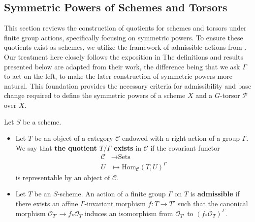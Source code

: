 \subsection{Symmetric Powers of Schemes and Torsors}
This section reviews the construction of quotients for schemes and torsors under finite group actions, specifically focusing on symmetric powers. 
To ensure these quotients exist as schemes, we utilize the framework of admissible actions from \cite{sga1}. 
Our treatment here closely follows the exposition in \cite{Guignard2018}
The definitions and results presented below are adapted from their work, the difference being that we ask $\Gamma$ to act on the left, to make the later construction of symmetric powers more natural. 
This foundation provides the necessary criteria for admissibility and base change required to define the symmetric powers of a scheme $X$
 and a $G$-torsor $\mathcal{P}$ over $X$.


Let $S$ be a scheme.

\begin{definition}
    \noindent
    \begin{itemize}
        \item Let $T$ be an object of a category $\mathcal{C}$ endowed with a right action of a group $\Gamma$. We say that \textbf{the quotient $T/\Gamma$ exists} in $\mathcal{C}$ if the covariant functor
    \[
    \begin{aligned}
    \mathcal{C} &\to \text{Sets} \\
    U &\mapsto \text{Hom}_{\mathcal{C}}(T, U)^{\Gamma}
    \end{aligned}
    \]
    is representable by an object of $\mathcal{C}$.
    \item Let $T$ be an $S$-scheme. An action of a finite group $\Gamma$ on $T$ is \textbf{admissible} if there exists an affine $\Gamma$-invariant morphism $f : T \to T'$ such that the canonical morphism $\mathcal{O}_{T'} \to f_* \mathcal{O}_T$ induces an isomorphism from $\mathcal{O}_{T'}$ to $(f_* \mathcal{O}_T)^{\Gamma}$.
\end{itemize}
\end{definition}

